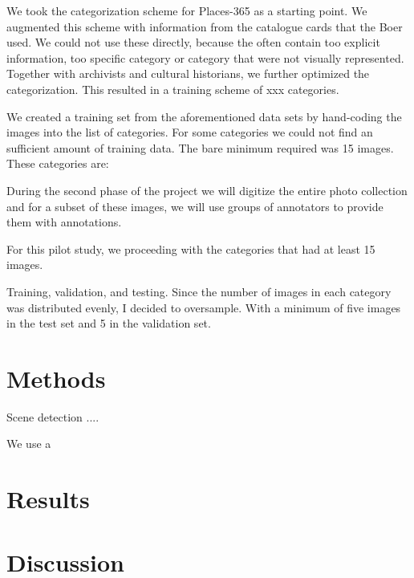\documentclass[12pt]{article}
\begin{document}
We took the categorization scheme for Places-365 as a starting point. We augmented this scheme with information from the catalogue cards that the Boer used. We could not use these directly, because the often contain too explicit information, too specific category or category that were not visually represented. Together with archivists and cultural historians, we further optimized the categorization. This resulted in a training scheme of xxx categories. 

We created a training set from the aforementioned data sets by hand-coding the images into the list of categories. For some categories we could not find an sufficient amount of training data. The bare minimum required was 15 images. These categories are: 

During the second phase of the project we will digitize the entire photo collection and for a subset of these images, we will use groups of annotators to provide them with annotations.

For this pilot study, we proceeding with the categories that had at least 15 images. 


Training, validation, and testing. Since the number of images in each category was distributed evenly, I decided to oversample. With a minimum of five images in the test set and 5 in the validation set. 




\section{Methods}
Scene detection .... 

We use a 


\section{Results}

\section{Discussion}
\end{document}
